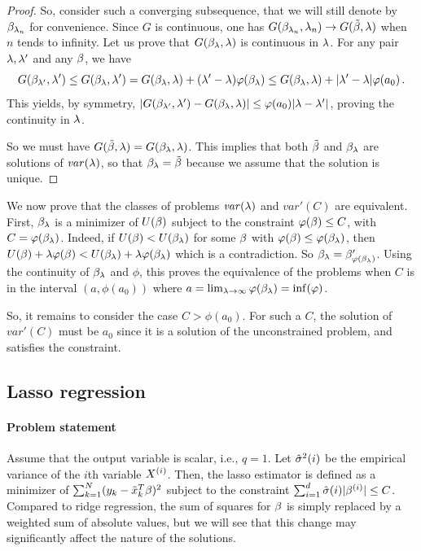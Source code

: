 \begin{proof}
So, consider such a converging subsequence, that we will still denote by $\beta_{\lambda_n}$ for convenience.
Since 
$G$ is continuous, one has $G(\beta_{\lambda_n}, \lambda_n) \to G(\tilde{\beta} , \lambda)$ when $n$ tends
to infinity. Let us prove that $G(\beta_\lambda, \lambda)$ is continuous { in $\lambda$}.
For any pair $\lambda, \lambda'$ and any $\beta$, we have
$$
G(\beta_{\lambda'}, \lambda')\leq G(\beta_\lambda, \lambda') = G(\beta_\lambda, \lambda) + (\lambda'-\lambda) \varphi(\beta_\lambda) \leq G(\beta_\lambda, \lambda) + 
|\lambda'-\lambda| \varphi({a_0})\,.
$$
This yields, by symmetry,
$|G(\beta_{\lambda'}, \lambda') - G(\beta_\lambda, \lambda)| \leq \varphi({a_0}) |\lambda-\lambda'|$, proving
the continuity in $\lambda$.

So we must have $G(\tilde{\beta}, \lambda) = G(\beta_\lambda, \lambda)$. This implies
that both $\tilde{\beta}$ and $\beta_\lambda$ are solutions of
$\mathit{var}(\lambda)$, so that $\beta_\lambda = \tilde {\beta}$ because we assume
that the solution is unique. 
\end{proof}

We now prove
that the classes of problems
$\mathit{var}(\lambda)$ and $\mathit{var}'(C)$ are  equivalent. First,
$\beta_\lambda$ is  a minimizer of $U(\beta)$ subject to the
constraint $\varphi(\beta) \leq C$, with $C =
\varphi(\beta_\lambda)$. Indeed, if $U(\beta) < U(\beta_\lambda)$ for some $\beta$ with $\varphi(\beta)
\leq \varphi(\beta_\lambda)$, then
$U(\beta) + \lambda \varphi(\beta) < U(\beta_\lambda) + \lambda \varphi(\beta_\lambda)$ which is a
contradiction. So $\beta_\lambda = \beta'_{\varphi(\beta_\lambda)}$. Using the continuity of $\beta_\lambda$ and $\phi$, this
proves the equivalence of the problems when $C$ is in the interval $(a,
\phi({a_0}))$ where $a = \lim_{\lambda\to\infty} \varphi(\beta_\lambda) = \inf(\varphi)$. 

So, it remains to consider the case  $C>
\phi({a_0})$. For such a $C$,  the solution of $\mathit{var}'(C)$
must be ${a_0}$ since it is a solution of the unconstrained
problem, and satisfies the constraint.

\subsection{Lasso regression}
\label{sec:lasso}
\paragraph{Problem statement}
Assume that the output variable is scalar, i.e., $q=1$.
Let $\hat {\sigma}^2(i)$ be the empirical variance of the
$i$th variable $X^{(i)}$. Then, the lasso estimator is defined as
a minimizer of
$\sum_{k=1}^N (y_k - {\tilde{x}}_k^T\beta)^2$ subject to the constraint
$\sum_{i=1}^d \hat {\sigma}(i)|\beta^{(i)}| \leq C$. Compared to ridge regression, the sum of squares for $\beta$ is
simply replaced by a weighted sum of absolute values, but we will see that this change may significantly affect the nature of the solutions. 

